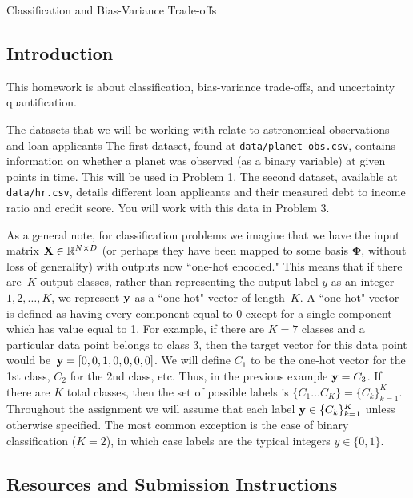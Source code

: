 \documentclass[submit]{../harvardml}
\begin{document}
\begin{center}
  {\Large Classification and Bias-Variance Trade-offs}\\
\end{center}

\subsection*{Introduction}

This homework is about classification, bias-variance trade-offs, and
uncertainty quantification.

The datasets that we will be working with relate to astronomical observations and loan applicants
The first dataset, found at \verb|data/planet-obs.csv|,
contains information on whether a planet was observed (as a binary
variable) at given points in time. This will be used in Problem 1. The
second dataset, available at \verb|data/hr.csv|, details different
loan applicants and their measured debt to income ratio and credit score. You will
work with this data in Problem 3.

As a general note, for classification problems we imagine that we have
the input matrix $\mathbf{X} \in \mathbb{R}^{N \times D}$ (or perhaps they
have been mapped to some basis $\bm{\Phi}$, without loss of
generality) with outputs now ``one-hot encoded."  This means that if
there are~$K$ output classes, rather than representing the output
label $y$ as an integer~${1,2,\ldots,K}$, we represent $\mathbf{y}$ as a
``one-hot" vector of length~$K$. A ``one-hot" vector is defined as
having every component equal to 0 except for a single component which
has value equal to 1.  For example, if there are $K = 7$ classes and a
particular data point belongs to class 3, then the target vector for
this data point would be~$\mathbf{y} = [0,0,1,0,0,0,0]$.  We will define
$C_1$ to be the one-hot vector for the 1st class, $C_2$ for the 2nd
class, etc.  Thus, in the previous example $\mathbf{y} = C_3$. If there
are $K$ total classes, then the set of possible labels is $\{C_1
  \ldots C_K \} = \{C_k\}_{k=1}^K$.  Throughout the assignment we will
assume that each label $\mathbf{y} \in \{C_k\}_{k=1}^K$ unless otherwise
specified. The most common exception is the case of binary
classification ($K = 2$), in which case labels are the typical
integers $y \in \{0, 1\}$.

\subsection*{Resources and Submission Instructions}
\end{document}
